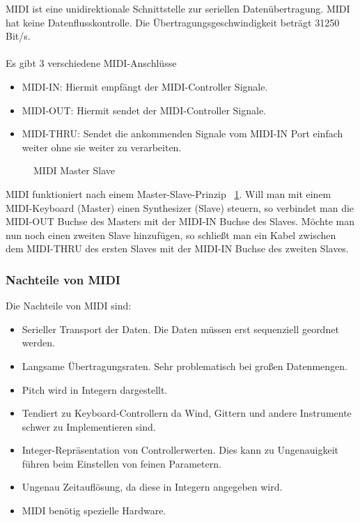 \documentclass[a4paper, 12pt]{article}
\begin{document}
MIDI ist eine unidirektionale Schnittstelle zur seriellen Datenübertragung. MIDI hat keine Datenflusskontrolle. Die Übertragungsgeschwindigkeit beträgt 31250 Bit/s. \cite{MIDI} \\
\\
Es gibt 3 verschiedene MIDI-Anschlüsse \begin{itemize}
  \item MIDI-IN: Hiermit empfängt der MIDI-Controller Signale.
  \item MIDI-OUT: Hiermit sendet der MIDI-Controller Signale.
  \item MIDI-THRU: Sendet die ankommenden Signale vom MIDI-IN Port einfach weiter ohne sie weiter zu verarbeiten.
\end{itemize}
 \begin{figure}[htbp]
  \centering
  \caption[MIDI Master Slave \cite{MMS}]{MIDI Master Slave}
  \label{fig:mms}
\end{figure}
MIDI funktioniert nach einem Master-Slave-Prinzip ~\ref{fig:mms}.
Will man mit einem MIDI-Keyboard (Master) einen Synthesizer (Slave) steuern, so verbindet man die MIDI-OUT Buchse des Masters mit der MIDI-IN Buchse des Slaves. Möchte man nun noch einen zweiten Slave hinzufügen, so schließt man ein Kabel zwischen dem MIDI-THRU des ersten Slaves mit der MIDI-IN Buchse des zweiten Slaves.

\subsubsection{Nachteile von MIDI}
Die Nachteile von MIDI sind:
\begin{itemize}
\item Serieller Transport der Daten. Die Daten müssen erst sequenziell geordnet werden.
  \item Langsame Übertragungsraten. Sehr problematisch bei großen Datenmengen.
  \item Pitch wird in Integern dargestellt.
  \item Tendiert zu Keyboard-Controllern da Wind, Gittern und andere Instrumente schwer zu Implementieren sind.
  \item Integer-Repräsentation von Controllerwerten. Dies kann zu Ungenauigkeit führen beim Einstellen von feinen Parametern.
  \item Ungenau Zeitauflösung, da diese in Integern angegeben wird.
  \item MIDI benötig spezielle Hardware.
\end{itemize}
\end{document}
